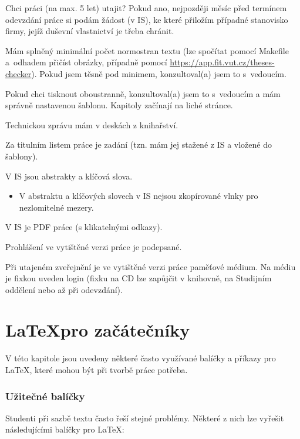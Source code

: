\begin{checklist}
\item Chci práci (na max. 5 let) utajit? Pokud ano, nejpozději měsíc před termínem odevzdání práce si podám žádost (v IS), ke které přiložím případné stanovisko firmy, jejíž duševní vlastnictví je třeba chránit.
\item Mám splněný minimální počet normostran textu (lze spočítat pomocí Makefile a~odhadem přičíst obrázky, případně pomocí \url{https://app.fit.vut.cz/theses-checker}). Pokud jsem těsně pod minimem, konzultoval(a) jsem to s~vedoucím.
\item Pokud chci tisknout oboustranně, konzultoval(a) jsem to s~vedoucím a mám správně nastavenou šablonu. Kapitoly začínají na liché stránce.
\item Technickou zprávu mám v deskách z knihařství.
\item Za titulním listem práce je zadání (tzn. mám jej stažené z IS a vložené do šablony).
\item V IS jsou abstrakty a klíčová slova.
  \begin{itemize}
    \item V abstraktu a klíčových slovech v IS nejsou zkopírované vlnky pro nezlomitelné mezery.
  \end{itemize}      
\item V IS je PDF práce (s klikatelnými odkazy).
\item Prohlášení ve vytištěné verzi práce je podepsané.
\item Při utajeném zveřejnění je ve vytištěné verzi práce paměťové médium. Na médiu je fixkou uveden login (fixku na CD lze zapůjčit v knihovně, na Studijním oddělení nebo až při odevzdání).
\end{checklist}


\chapter{\LaTeX pro začátečníky}
\label{latex}

V této kapitole jsou uvedeny některé často využívané balíčky a příkazy pro \LaTeX{}, které mohou být při tvorbě práce potřeba.

\subsection*{Užitečné balíčky}

Studenti při sazbě textu často řeší stejné problémy. Některé z nich lze vyřešit následujícími balíčky pro \LaTeX:

